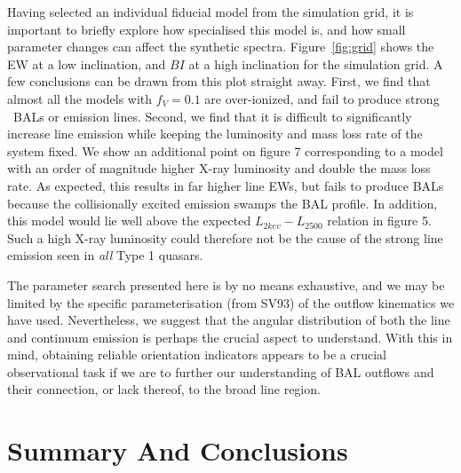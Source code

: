 \documentclass[useAMS,usenatbib]{mn2e_x}
\begin{document}
Having selected an individual fiducial model from the simulation grid, it is important
to briefly explore how specialised this model is, and how small parameter
changes can affect the synthetic spectra. Figure~\ref{fig:grid}
shows the EW at a low inclination, and $BI$ at a high inclination for the simulation
grid. A few conclusions can be drawn from this plot straight away. 
First, we find that almost all the models with $f_V=0.1$ are over-ionized, and 
fail to produce strong \civ\ BALs or emission lines. Second, we find that 
it is difficult to significantly increase line emission while
keeping the luminosity and mass loss rate of the system fixed. 
We show an additional point on figure 7 corresponding to a model with an order of
magnitude higher X-ray luminosity and double the mass loss rate. As expected, 
this results in far higher line EWs, but fails to produce BALs because
the collisionally excited emission swamps the BAL profile. In addition,
this model would lie well above the expected $L_{2kev}-L_{2500}$ 
relation in figure 5. Such a high X-ray luminosity could therefore 
not be the cause of the strong line emission seen in {\em all} Type 1 quasars.

The parameter search presented here is by no means exhaustive, and
we may be limited by the specific parameterisation (from SV93) of the outflow 
kinematics we have used. Nevertheless, we suggest that the angular distribution
of both the line and continuum emission is perhaps the crucial 
aspect to understand. With this in mind, obtaining reliable orientation 
indicators appears to be a crucial observational task if we are to
further our understanding of BAL outflows 
and their connection, or lack thereof, to the 
broad line region. 




\section{Summary And Conclusions}
\end{document}
